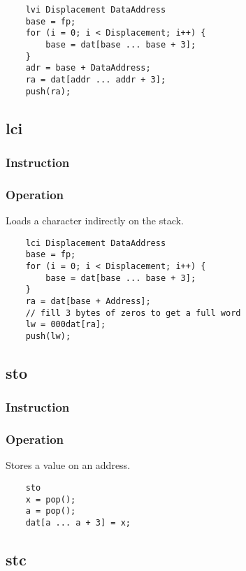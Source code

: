 	\begin{lstlisting}
	lvi Displacement DataAddress
	base = fp;
	for (i = 0; i < Displacement; i++) {
		base = dat[base ... base + 3];
	}
	adr = base + DataAddress;
	ra = dat[addr ... addr + 3];
	push(ra);
	\end{lstlisting}

\subsection{lci}
\subsubsection{Instruction}

\subsubsection{Operation}
Loads a character indirectly on the stack.

	\begin{lstlisting}
	lci Displacement DataAddress
	base = fp;
	for (i = 0; i < Displacement; i++) {
		base = dat[base ... base + 3];
	}
	ra = dat[base + Address];
	// fill 3 bytes of zeros to get a full word
	lw = 000dat[ra];
	push(lw);
	\end{lstlisting}

\subsection{sto}
\subsubsection{Instruction}

\subsubsection{Operation}
Stores a value on an address.

	\begin{lstlisting}
	sto
	x = pop();
	a = pop();
	dat[a ... a + 3] = x;
	\end{lstlisting}

\subsection{stc}
